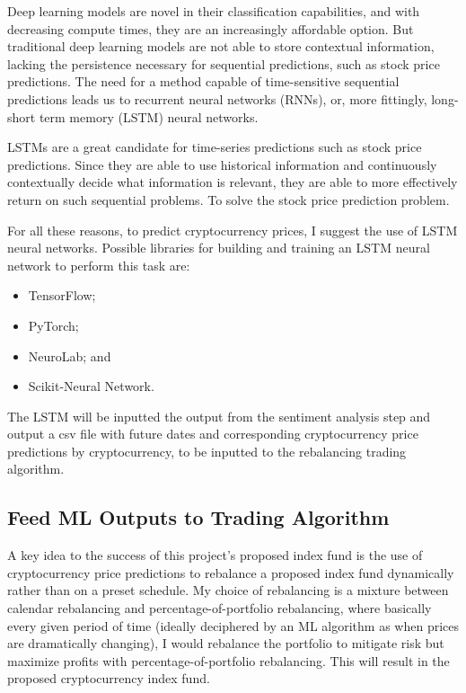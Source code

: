 \documentclass[10pt,twocolumn]{article}
\begin{document}
Deep learning models are novel in their classification capabilities, and with decreasing compute times, they are an increasingly affordable option. But traditional deep learning models are not able to store contextual information, lacking the persistence necessary for sequential predictions, such as stock price predictions. The need for a method capable of time-sensitive sequential predictions leads us to recurrent neural networks (RNNs), or, more fittingly, long-short term memory (LSTM) neural networks.

LSTMs are a great candidate for time-series predictions such as stock price predictions. Since they are able to use historical information and continuously contextually decide what information is relevant, they are able to more effectively return on such sequential problems. To solve the stock price prediction problem.

For all these reasons, to predict cryptocurrency prices, I suggest the use of LSTM neural networks. Possible libraries for building and training an LSTM neural network to perform this task are:

\begin{itemize}
    \item TensorFlow;
    \item PyTorch;
    \item NeuroLab; and
    \item Scikit-Neural Network.
\end{itemize}

The LSTM will be inputted the output from the sentiment analysis step and output a csv file with future dates and corresponding cryptocurrency price predictions by cryptocurrency, to be inputted to the rebalancing trading algorithm.

\subsection{Feed ML Outputs to Trading Algorithm}

A key idea to the success of this project's proposed index fund is the use of cryptocurrency price predictions to rebalance a proposed index fund dynamically rather than on a preset schedule. My choice of rebalancing is a mixture between calendar rebalancing and percentage-of-portfolio rebalancing, where basically every given period of time (ideally deciphered by an ML algorithm as when prices are dramatically changing), I would rebalance the portfolio to mitigate risk but maximize profits with percentage-of-portfolio rebalancing. This will result in the proposed cryptocurrency index fund.
\end{document}
